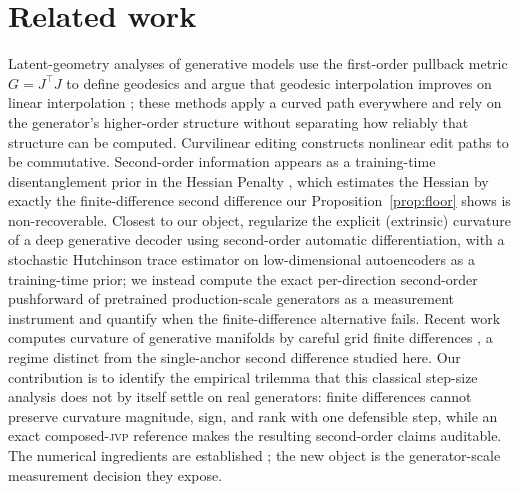 \documentclass[10pt]{article}
\newcommand{\jvp}{\textsc{jvp}}
\begin{document}
\section{Related work}
\label{sec:related}
Latent-geometry analyses of generative models use the first-order pullback metric $G=J^\top J$ to define
geodesics and argue that geodesic interpolation improves on linear interpolation
\citep{arvanitidis2018,shao2018,chen2018,yang2018}; these methods apply a curved path everywhere and rely
on the generator's higher-order structure without separating how reliably that structure can be computed.
Curvilinear editing \citep{aoshima2023} constructs nonlinear edit paths to be commutative. Second-order
information appears as a training-time disentanglement prior in the Hessian Penalty \citep{peebles2020},
which estimates the Hessian by exactly the finite-difference second difference our
Proposition~\ref{prop:floor} shows is non-recoverable. Closest to our object,
\citet{lee2023} regularize the explicit (extrinsic) curvature of a deep generative decoder
using second-order automatic differentiation, with a stochastic Hutchinson trace estimator
on low-dimensional autoencoders as a training-time prior; we instead compute the exact
per-direction second-order pushforward of pretrained production-scale generators as a
measurement instrument and quantify when the finite-difference alternative fails. Recent work computes curvature of generative
manifolds by careful grid finite differences \citep{koulakis2026}, a regime distinct from the
single-anchor second difference studied here. Our contribution is to identify the empirical
trilemma that this classical step-size analysis does not by itself settle on real generators:
finite differences cannot preserve curvature magnitude, sign, and rank with one defensible
step, while an exact composed-\jvp{} reference makes the resulting second-order claims auditable.
The numerical ingredients are established \citep{press2007,higham2002,pearlmutter1994,fike2011,griewank2008,baydin2018,cobb2024};
the new object is the generator-scale measurement decision they expose.
\end{document}
